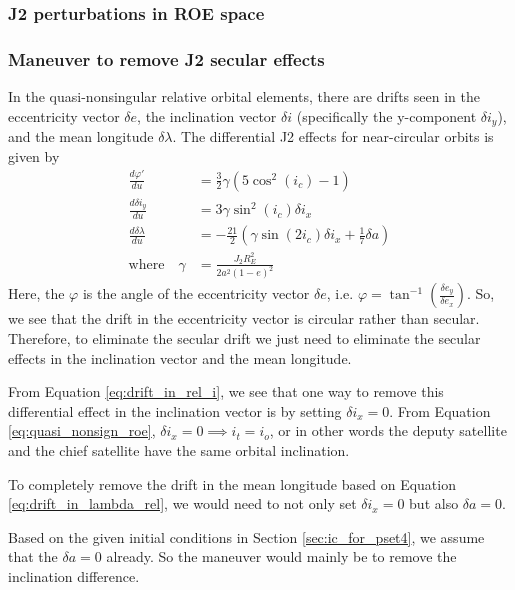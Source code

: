 \subsubsection{J2 perturbations in ROE space}

\subsubsection{Maneuver to remove J2 secular effects}

In the quasi-nonsingular relative orbital elements, there are drifts seen in the eccentricity vector $\delta e$, the inclination vector $\delta i$ (specifically the y-component $\delta i_y$), and the mean longitude $\delta \lambda$. The differential J2 effects for near-circular orbits is given by
\begin{align}
    \frac{d \varphi'}{d u} &= \frac{3}{2} \gamma (5\cos^2(i_c) - 1) \\
    \frac{d \delta i_y}{d u} &= 3\gamma \sin^2(i_c) \delta i_x \label{eq:drift_in_rel_i} \\
    \frac{d \delta \lambda}{d u} &= -\frac{21}{2}\left(\gamma \sin(2i_c)\delta i_x 
+ \frac{1}{7} \delta a\right) \label{eq:drift_in_lambda_rel}\\
    \text{where} \quad \gamma  &= \frac{J_2 R_E^2}{2 a^2 (1 - e)^2}
\end{align}
Here, the $\varphi$ is the angle of the eccentricity vector $\delta e$, i.e. $\varphi = \tan^{-1}\left(\frac{\delta e_y}{\delta e_x}\right)$. So, we see that the drift in the eccentricity vector is circular rather than secular. Therefore, to eliminate the secular drift we just need to eliminate the secular effects in the inclination vector and the mean longitude.

From Equation \ref{eq:drift_in_rel_i}, we see that one way to remove this differential effect in the inclination vector is by setting $\delta i_x = 0$. From Equation \ref{eq:quasi_nonsign_roe}, $\delta i_x = 0 \implies i_t = i_o$, or in other words the deputy satellite and the chief satellite have the same orbital inclination. 

To completely remove the drift in the mean longitude based on Equation \ref{eq:drift_in_lambda_rel}, we would need to not only set $\delta i_x = 0$ but also  $\delta a = 0$. 

Based on the given initial conditions in Section \ref{sec:ic_for_pset4}, we assume that the $\delta a = 0$ already. So the maneuver would mainly be to remove the inclination difference. 

